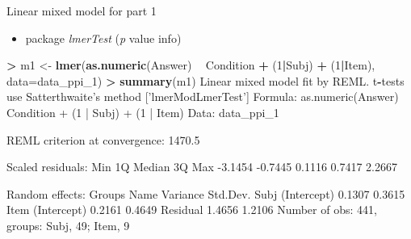 \documentclass[ignorenonframetext,]{beamer}
\newenvironment{Shaded}{\begin{snugshade}}{\end{snugshade}}
\newcommand{\KeywordTok}[1]{\textcolor[rgb]{0.13,0.29,0.53}{\textbf{#1}}}
\newcommand{\DataTypeTok}[1]{\textcolor[rgb]{0.13,0.29,0.53}{#1}}
\newcommand{\DecValTok}[1]{\textcolor[rgb]{0.00,0.00,0.81}{#1}}
\newcommand{\StringTok}[1]{\textcolor[rgb]{0.31,0.60,0.02}{#1}}
\newcommand{\OperatorTok}[1]{\textcolor[rgb]{0.81,0.36,0.00}{\textbf{#1}}}
\newcommand{\NormalTok}[1]{#1}
\providecommand{\tightlist}{%
  \setlength{\itemsep}{0pt}\setlength{\parskip}{0pt}}
\begin{document}
\begin{frame}{Linear mixed model for part 1}

\begin{itemize}
\tightlist
\item
  package \emph{lmerTest} (\emph{p} value info)
\end{itemize}

\tiny

\begin{Shaded}
\begin{Highlighting}[]
\OperatorTok{>}\StringTok{ }\NormalTok{m1 <-}\StringTok{ }\KeywordTok{lmer}\NormalTok{(}\KeywordTok{as.numeric}\NormalTok{(Answer) }\OperatorTok{~}\StringTok{ }\NormalTok{Condition }\OperatorTok{+}\StringTok{ }\NormalTok{(}\DecValTok{1}\OperatorTok{|}\NormalTok{Subj) }\OperatorTok{+}\StringTok{ }\NormalTok{(}\DecValTok{1}\OperatorTok{|}\NormalTok{Item), }\DataTypeTok{data=}\NormalTok{data_ppi_}\DecValTok{1}\NormalTok{)}
\OperatorTok{>}\StringTok{ }\KeywordTok{summary}\NormalTok{(m1)}
\NormalTok{Linear mixed model fit by REML. t}\OperatorTok{-}\NormalTok{tests use Satterthwaite}\StringTok{'s method ['}\NormalTok{lmerModLmerTest}\StringTok{']}
\StringTok{Formula: as.numeric(Answer) ~ Condition + (1 | Subj) + (1 | Item)}
\StringTok{   Data: data_ppi_1}

\StringTok{REML criterion at convergence: 1470.5}

\StringTok{Scaled residuals: }
\StringTok{    Min      1Q  Median      3Q     Max }
\StringTok{-3.1454 -0.7445  0.1116  0.7417  2.2667 }

\StringTok{Random effects:}
\StringTok{ Groups   Name        Variance Std.Dev.}
\StringTok{ Subj     (Intercept) 0.1307   0.3615  }
\StringTok{ Item     (Intercept) 0.2161   0.4649  }
\StringTok{ Residual             1.4656   1.2106  }
\StringTok{Number of obs: 441, groups:  Subj, 49; Item, 9}
\end{Highlighting}
\end{Shaded}

\end{frame}
\end{document}
